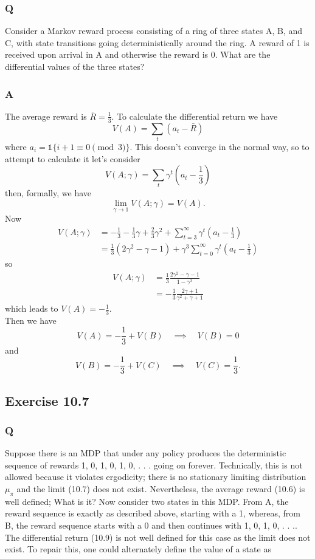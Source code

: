\subsubsection*{Q}
Consider a Markov reward process consisting of a ring of three states A, B, and C, with state transitions going deterministically around the ring. A reward of 1 is received upon arrival in A and otherwise the reward is 0. What are the differential values of the three states?
\subsubsection*{A}
The average reward is $\bar{R} = \frac13$. To calculate the differential return we have 
\[
    V(A) = \sum_t (a_t - \bar{R})
\]
where $a_i = \mathds{1}\{i + 1 \equiv 0 \pmod 3\}$. This doesn't converge in the normal way, so to attempt to calculate it let's consider
\[
    V(A; \gamma) = \sum_t \gamma^t \left( a_t - \frac13\right)
\]
then, formally, we have
\[
    \lim_{\gamma \to 1} V(A; \gamma) = V(A).
\]
Now 
\begin{align*}
    V(A; \gamma) &= - \frac13 - \frac13 \gamma  + \frac23 \gamma^2 + \sum_{t=3}^{\infty} \gamma^t \left(a_t - \frac13\right) \\
                 &= \frac13 (2 \gamma^2 - \gamma - 1) + \gamma ^3 \sum_{t=0}^{\infty} \gamma^t \left(a_t - \frac13\right)
\end{align*}
so
\begin{align*}
    V(A; \gamma) &= \frac13 \frac{2 \gamma^2 - \gamma - 1}{1 - \gamma^3} \\
                 &= -\frac13 \frac{2 \gamma + 1}{\gamma^2 + \gamma +1}
\end{align*}
which leads to $V(A) = -\frac13$. \\

Then we have 
\[
    V(A) = -\frac13 + V(B) \quad \implies \quad V(B) = 0
\]
and
\[
    V(B) = -\frac13 + V(C) \quad \implies \quad V(C) = \frac13.
\]

\subsection{Exercise 10.7}
\subsubsection*{Q}
Suppose there is an MDP that under any policy produces the deterministic sequence of rewards 1, 0, 1, 0, 1, 0, . . . going on forever. Technically, this is not allowed because it violates ergodicity; there is no stationary limiting distribution $\mu_\pi$ and the limit (10.7) does not exist. Nevertheless, the average reward (10.6) is well defined; What is it? Now consider two states in this MDP. From A, the reward sequence is exactly as described above, starting with a 1, whereas, from B, the reward sequence starts with a 0 and then continues with 1, 0, 1, 0, . . .. The differential return (10.9) is not well defined for this case as the limit does not exist. To repair this, one could alternately define the value of a state as

